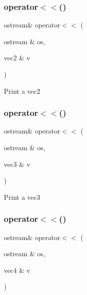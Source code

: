 \subsubsection{\texorpdfstring{operator$<$$<$()}{operator<<()}\hspace{0.1cm}{\footnotesize\ttfamily [1/4]}}
{\footnotesize\ttfamily ostream\& operator$<$$<$ (\begin{DoxyParamCaption}\item[{ostream \&}]{os,  }\item[{vec2 \&}]{v }\end{DoxyParamCaption})}

Print a vec2 \mbox{\label{cout-definitions_8hpp_a9785ea3eade9968a62d5e9836f720617}} 
\subsubsection{\texorpdfstring{operator$<$$<$()}{operator<<()}\hspace{0.1cm}{\footnotesize\ttfamily [2/4]}}
{\footnotesize\ttfamily ostream\& operator$<$$<$ (\begin{DoxyParamCaption}\item[{ostream \&}]{os,  }\item[{vec3 \&}]{v }\end{DoxyParamCaption})}

Print a vec3 \mbox{\label{cout-definitions_8hpp_aced74fdd5c32b973692a20e6272a5f56}} 
\subsubsection{\texorpdfstring{operator$<$$<$()}{operator<<()}\hspace{0.1cm}{\footnotesize\ttfamily [3/4]}}
{\footnotesize\ttfamily ostream\& operator$<$$<$ (\begin{DoxyParamCaption}\item[{ostream \&}]{os,  }\item[{vec4 \&}]{v }\end{DoxyParamCaption})}

